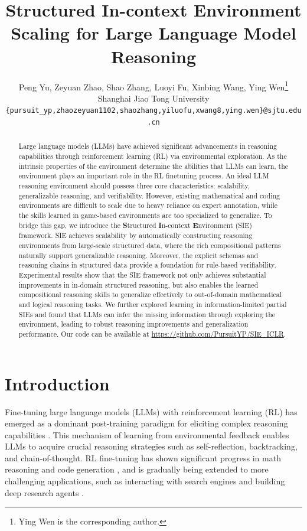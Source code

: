 \documentclass{article} %
\title{Structured In-context Environment Scaling for Large Language Model Reasoning}
\author{Peng Yu, Zeyuan Zhao, Shao Zhang, Luoyi Fu, Xinbing Wang, Ying Wen\thanks{Ying Wen is the corresponding author.} \\
Shanghai Jiao Tong University \\
\texttt{\{pursuit\_yp,zhaozeyuan1102,shaozhang,yiluofu,xwang8,ying.wen\}@sjtu.edu.cn}
}
\begin{document}
\maketitle

\begin{abstract}
Large language models (LLMs) have achieved significant advancements in reasoning capabilities through reinforcement learning (RL) via environmental exploration. As the intrinsic properties of the environment determine the abilities that LLMs can learn, the environment plays an important role in the RL finetuning process. An ideal LLM reasoning environment should possess three core characteristics: scalability, generalizable reasoning, and verifiability. However, existing mathematical and coding environments are difficult to scale due to heavy reliance on expert annotation, while the skills learned in game-based environments are too specialized to generalize. To bridge this gap, we introduce the \textbf{S}tructured \textbf{I}n-context \textbf{E}nvironment (SIE) framework. SIE achieves scalability by automatically constructing reasoning environments from large-scale structured data, where the rich compositional patterns naturally support generalizable reasoning. Moreover, the explicit schemas and reasoning chains in structured data provide a foundation for rule-based verifiability. Experimental results show that the SIE framework not only achieves substantial improvements in in-domain structured reasoning, but also enables the learned compositional reasoning skills to generalize effectively to out-of-domain mathematical and logical reasoning tasks. We further explored learning in information-limited partial SIEs and found that LLMs can infer the missing information through exploring the environment, leading to robust reasoning improvements and generalization performance. Our code can be available at \url{https://github.com/PursuitYP/SIE_ICLR}.
\end{abstract}


\section{Introduction}
Fine-tuning large language models (LLMs) with reinforcement learning (RL) has emerged as a dominant post-training paradigm for eliciting complex reasoning capabilities \citep{jaech2024openai, guo2025deepseek, team2025kimi, comanici2025gemini}. This mechanism of learning from environmental feedback enables LLMs to acquire crucial reasoning strategies such as self-reflection, backtracking, and chain-of-thought. RL fine-tuning has shown significant progress in math reasoning and code generation \citep{zeng2025simplerl, hu2025open, chen2025r1}, and is gradually being extended to more challenging applications, such as interacting with search engines and building deep research agents \citep{jin2025search, zheng2025deepresearcher, li2025webthinker, tongyidr}. 
\end{document}
